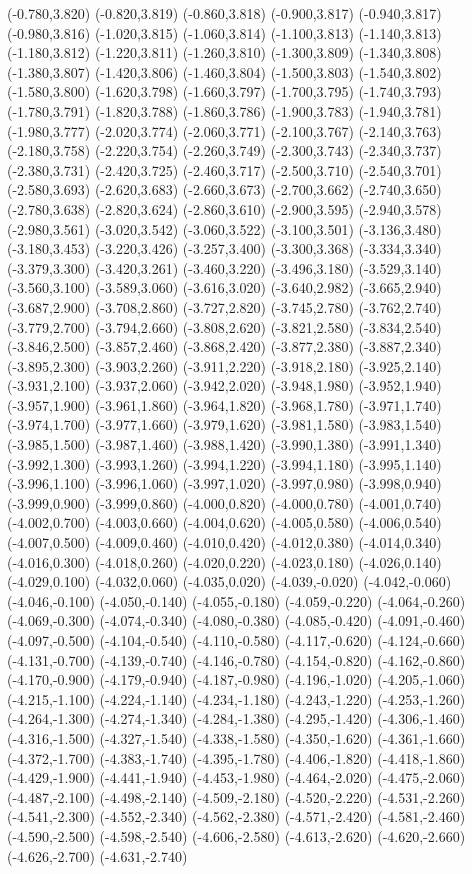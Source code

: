 (-0.780,3.820) (-0.820,3.819) (-0.860,3.818) (-0.900,3.817) (-0.940,3.817) (-0.980,3.816) (-1.020,3.815) (-1.060,3.814) (-1.100,3.813) (-1.140,3.813) (-1.180,3.812) (-1.220,3.811) (-1.260,3.810) (-1.300,3.809) (-1.340,3.808) (-1.380,3.807) (-1.420,3.806) (-1.460,3.804) (-1.500,3.803) (-1.540,3.802) (-1.580,3.800) (-1.620,3.798) (-1.660,3.797) (-1.700,3.795) (-1.740,3.793) (-1.780,3.791) (-1.820,3.788) (-1.860,3.786) (-1.900,3.783) (-1.940,3.781) (-1.980,3.777) (-2.020,3.774) (-2.060,3.771) (-2.100,3.767) (-2.140,3.763) (-2.180,3.758) (-2.220,3.754) (-2.260,3.749) (-2.300,3.743) (-2.340,3.737) (-2.380,3.731) (-2.420,3.725) (-2.460,3.717) (-2.500,3.710) (-2.540,3.701) (-2.580,3.693) (-2.620,3.683) (-2.660,3.673) (-2.700,3.662) (-2.740,3.650) (-2.780,3.638) (-2.820,3.624) (-2.860,3.610) (-2.900,3.595) (-2.940,3.578) (-2.980,3.561) (-3.020,3.542) (-3.060,3.522) (-3.100,3.501) (-3.136,3.480) (-3.180,3.453) (-3.220,3.426) (-3.257,3.400) (-3.300,3.368) (-3.334,3.340) (-3.379,3.300) (-3.420,3.261) (-3.460,3.220) (-3.496,3.180) (-3.529,3.140) (-3.560,3.100) (-3.589,3.060) (-3.616,3.020) (-3.640,2.982) (-3.665,2.940) (-3.687,2.900) (-3.708,2.860) (-3.727,2.820) (-3.745,2.780) (-3.762,2.740) (-3.779,2.700) (-3.794,2.660) (-3.808,2.620) (-3.821,2.580) (-3.834,2.540) (-3.846,2.500) (-3.857,2.460) (-3.868,2.420) (-3.877,2.380) (-3.887,2.340) (-3.895,2.300) (-3.903,2.260) (-3.911,2.220) (-3.918,2.180) (-3.925,2.140) (-3.931,2.100) (-3.937,2.060) (-3.942,2.020) (-3.948,1.980) (-3.952,1.940) (-3.957,1.900) (-3.961,1.860) (-3.964,1.820) (-3.968,1.780) (-3.971,1.740) (-3.974,1.700) (-3.977,1.660) (-3.979,1.620) (-3.981,1.580) (-3.983,1.540) (-3.985,1.500) (-3.987,1.460) (-3.988,1.420) (-3.990,1.380) (-3.991,1.340) (-3.992,1.300) (-3.993,1.260) (-3.994,1.220) (-3.994,1.180) (-3.995,1.140) (-3.996,1.100) (-3.996,1.060) (-3.997,1.020) (-3.997,0.980) (-3.998,0.940) (-3.999,0.900) (-3.999,0.860) (-4.000,0.820) (-4.000,0.780) (-4.001,0.740) (-4.002,0.700) (-4.003,0.660) (-4.004,0.620) (-4.005,0.580) (-4.006,0.540) (-4.007,0.500) (-4.009,0.460) (-4.010,0.420) (-4.012,0.380) (-4.014,0.340) (-4.016,0.300) (-4.018,0.260) (-4.020,0.220) (-4.023,0.180) (-4.026,0.140) (-4.029,0.100) (-4.032,0.060) (-4.035,0.020) (-4.039,-0.020) (-4.042,-0.060) (-4.046,-0.100) (-4.050,-0.140) (-4.055,-0.180) (-4.059,-0.220) (-4.064,-0.260) (-4.069,-0.300) (-4.074,-0.340) (-4.080,-0.380) (-4.085,-0.420) (-4.091,-0.460) (-4.097,-0.500) (-4.104,-0.540) (-4.110,-0.580) (-4.117,-0.620) (-4.124,-0.660) (-4.131,-0.700) (-4.139,-0.740) (-4.146,-0.780) (-4.154,-0.820) (-4.162,-0.860) (-4.170,-0.900) (-4.179,-0.940) (-4.187,-0.980) (-4.196,-1.020) (-4.205,-1.060) (-4.215,-1.100) (-4.224,-1.140) (-4.234,-1.180) (-4.243,-1.220) (-4.253,-1.260) (-4.264,-1.300) (-4.274,-1.340) (-4.284,-1.380) (-4.295,-1.420) (-4.306,-1.460) (-4.316,-1.500) (-4.327,-1.540) (-4.338,-1.580) (-4.350,-1.620) (-4.361,-1.660) (-4.372,-1.700) (-4.383,-1.740) (-4.395,-1.780) (-4.406,-1.820) (-4.418,-1.860) (-4.429,-1.900) (-4.441,-1.940) (-4.453,-1.980) (-4.464,-2.020) (-4.475,-2.060) (-4.487,-2.100) (-4.498,-2.140) (-4.509,-2.180) (-4.520,-2.220) (-4.531,-2.260) (-4.541,-2.300) (-4.552,-2.340) (-4.562,-2.380) (-4.571,-2.420) (-4.581,-2.460) (-4.590,-2.500) (-4.598,-2.540) (-4.606,-2.580) (-4.613,-2.620) (-4.620,-2.660) (-4.626,-2.700) (-4.631,-2.740) 